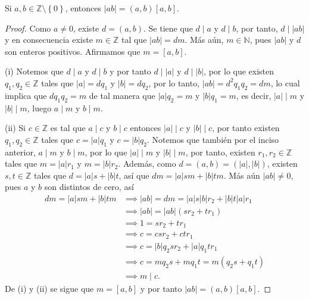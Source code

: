 \begin{theorem}
Si $a,b\in \mathbb{Z}\setminus \left\{0\right\}$, entonces $|a b|=(a,b)[a,b]$.
\end{theorem}
\begin{proof}
Como $a\neq 0$, existe $d=(a,b)$. Se tiene que $d \mid a$ y $d \mid b$, por tanto, $d \mid |ab|$ y en consecuencia existe $m\in \mathbb{Z}$ tal que $|ab|=dm$. Más aún, $m\in \mathbb{N}$, pues $|a b|$ y $d$ son enteros positivos. Afirmamos que $m=[a,b]$.
\bigskip

(i) Notemos que $d \mid a$ y $d \mid b$ y por tanto $d \mid |a|$ y $d \mid |b|$, por lo que existen $q_{1},q_{2}\in \mathbb{Z}$ tales que $|a|=dq_{1}$ y $|b|=dq_{2}$, por lo tanto, $|a b|=d^{2}q_{1}q_{2}=dm$, lo cual implica que $dq_{1}q_{2}=m$ de tal manera que $|a|q_{2}=m$ y $|b|q_{1}=m$, es decir, $|a| \mid m$ y $|b| \mid m$, luego $a \mid m$ y $b \mid m$.
\bigskip

(ii) Si $c\in \mathbb{Z}$ es tal que $a \mid c$ y $b \mid c$ entonces  $|a|\mid c$ y $|b|\mid c$, por tanto existen $q_{1},q_{2}\in \mathbb{Z}$ tales que $c=|a|q_{1}$ y $c=|b|q_{2}$. Notemos que también por el inciso anterior, $a \mid m$ y $b \mid m$, por lo que $|a|\mid m$ y $|b| \mid m$, por tanto, existen $r_{1},r_{2}\in \mathbb{Z}$ tales que $m=|a|r_{1}$ y $m=|b|r_{2}$. Además, como $d=(a,b)=(|a|,|b|)$, existen $s,t\in \mathbb{Z}$ tales que $d=|a| s+|b| t$, así que $d m=|a| s m+|b| t m$. Más aún $|a b|\neq 0$, pues $a$ y $b$ son distintos de cero, así
\begin{align*}
	d m=|a| s m+|b| t m &\implies |a b| = d m=|a| s |b| r_{2}+|b| t |a| r_{1} \\
					&\implies |a b|=|a b|(sr_{2}+tr_{1}) \\
					&\implies 1=s r_{2}+t r_{1} \\
					&\implies c=c s r_{2}+c t r_{1} \\
					&\implies c=|b| q_{2}s r_{2}+|a| q_{1} t r_{1} \\
					&\implies c=m q_{2} s+m q_{1}t=m(q_{2}s+q_{1}t) \\
					&\implies m \mid c.
\end{align*}
De (i) y (ii) se sigue que $m=[a,b]$ y por tanto $|a b|=(a,b)[a,b]$.
\end{proof}


